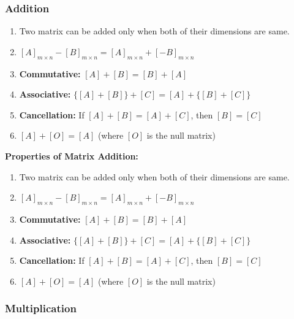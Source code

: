 \subsubsection{Addition}

\begin{enumerate}
    \item Two matrix can be added only when both of their dimensions are same.

    \item $[A]_{m \times n} - [B]_{m \times n} = [A]_{m \times n} + [-B]_{m \times n}$

    \item \textbf{Commutative:} $[A] + [B] = [B] + [A]$

    \item \textbf{Associative:} $\{[A] + [B]\} + [C] = [A] + \{[B] + [C]\}$

    \item \textbf{Cancellation:} If $[A] + [B] = [A] + [C]$, then $[B] = [C]$

    \item $[A] + [O] = [A]$ \quad (where $[O]$ is the null matrix)
\end{enumerate}

\textbf{Properties of Matrix Addition:}

\begin{enumerate}
    \item Two matrix can be added only when both of their dimensions are same.

    \item $[A]_{m \times n} - [B]_{m \times n} = [A]_{m \times n} + [-B]_{m \times n}$

    \item \textbf{Commutative:} $[A] + [B] = [B] + [A]$

    \item \textbf{Associative:} $\{[A] + [B]\} + [C] = [A] + \{[B] + [C]\}$

    \item \textbf{Cancellation:} If $[A] + [B] = [A] + [C]$, then $[B] = [C]$

    \item $[A] + [O] = [A]$ \quad (where $[O]$ is the null matrix)
\end{enumerate}

\subsubsection{Multiplication}

